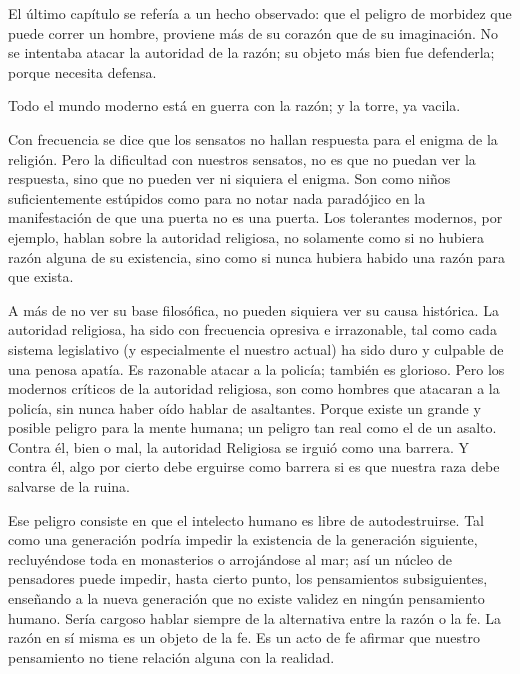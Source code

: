 El último capítulo se refería a un hecho observado: que el peligro de morbidez que puede correr un
hombre, proviene más de su corazón que de su imaginación. No se intentaba atacar la autoridad de la
razón; su objeto más bien fue defenderla; porque necesita defensa.

Todo el mundo moderno está en guerra con la razón; y la torre, ya vacila.

Con frecuencia se dice que los sensatos no hallan respuesta para el enigma de la religión. Pero la
dificultad con nuestros sensatos, no es que no puedan ver la respuesta, sino que no pueden ver ni siquiera
el enigma. Son como niños suficientemente estúpidos como para no notar nada paradójico en la
manifestación de que una puerta no es una puerta. Los tolerantes modernos, por ejemplo, hablan sobre la
autoridad religiosa, no solamente como si no hubiera razón alguna de su existencia, sino como si nunca
hubiera habido una razón para que exista.

A más de no ver su base filosófica, no pueden siquiera ver su causa histórica. La autoridad religiosa,
ha sido con frecuencia opresiva e irrazonable, tal como cada sistema legislativo (y especialmente el
nuestro actual) ha sido duro y culpable de una penosa apatía. Es razonable atacar a la policía; también es
glorioso. Pero los modernos críticos de la autoridad religiosa, son como hombres que atacaran a la policía,
sin nunca haber oído hablar de asaltantes. Porque existe un grande y posible peligro para la mente
humana; un peligro tan real como el de un asalto. Contra él, bien o mal, la autoridad Religiosa se irguió
como una barrera. Y contra él, algo por cierto debe erguirse como barrera si es que nuestra raza debe
salvarse de la ruina.

Ese peligro consiste en que el intelecto humano es libre de autodestruirse. Tal como una generación
podría impedir la existencia de la generación siguiente, recluyéndose toda en monasterios o arrojándose al
mar; así un núcleo de pensadores puede impedir, hasta cierto punto, los pensamientos subsiguientes,
enseñando a la nueva generación que no existe validez en ningún pensamiento humano. Sería cargoso
hablar siempre de la alternativa entre la razón o la fe. La razón en sí misma es un objeto de la fe. Es un
acto de fe afirmar que nuestro pensamiento no tiene relación alguna con la realidad.

